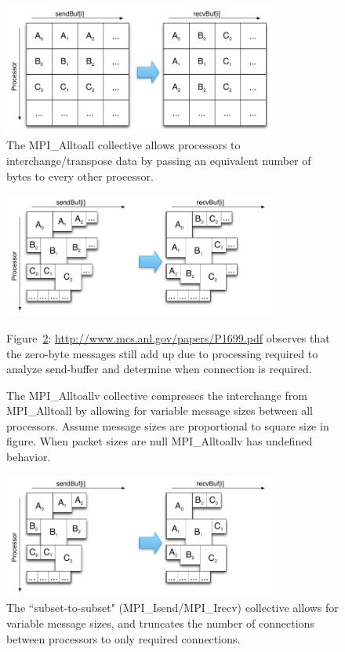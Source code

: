 \documentclass{report}
\begin{document}
\begin{figure}[ht!]
\begin{center}
\includegraphics[width=9cm]{../figures/omnigraffle/MPI_Alltoall_Visual.png}
\caption{The MPI\_Alltoall collective allows processors to interchange/transpose data by passing an equivalent number of bytes to every other processor.}
\label{fig:mpi_alltoall_visual}
\end{center}
\end{figure}
\begin{figure}[ht!]
\begin{center}
\includegraphics[width=9cm]{../figures/omnigraffle/MPI_Alltoallv_Visual.png}
\caption{The MPI\_Alltoallv collective compresses the interchange from MPI\_Alltoall by allowing for variable message sizes between all processors. Assume message sizes are proportional to square size in figure. When packet sizes are null MPI\_Alltoallv has undefined behavior.}
\label{fig:mpi_alltoallv_visual}
\end{center}

Figure~\ref{fig:mpi_alltoallv_visual}: \url{http://www.mcs.anl.gov/papers/P1699.pdf} observes that the zero-byte messages still add up due to processing required to analyze send-buffer and determine when connection is required. 


\end{figure}
\begin{figure}[ht!]
\begin{center}
\includegraphics[width=9cm]{../figures/omnigraffle/MPI_IsendIrecv_Visual.png}
\caption{The ``subset-to-subset" (MPI\_Isend/MPI\_Irecv) collective allows for variable message sizes, and truncates the number of connections between processors to only required connections.}
\label{fig:mpi_isendirecv_visual}
\end{center}
\end{figure}
\end{document}
